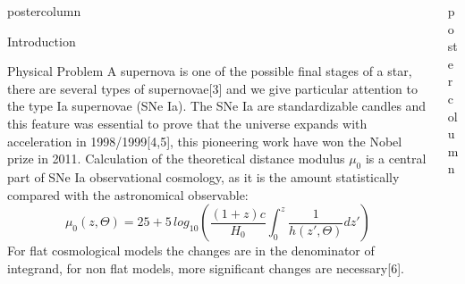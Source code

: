 \documentclass[final,hyperref={pdfpagelabels=false}]{beamer}
\newlength{\columnheight}
\begin{document}
\begin{frame}
\begin{columns}
\begin{column}{.245\textwidth}
\begin{beamercolorbox}[center,wd=\textwidth]{postercolumn}
\begin{minipage}[T]{.95\textwidth}
{\begin{block}{Introduction}
            \end{block}
            \vspace{.005\columnheight}
  			\begin{block}{Physical Problem}
              A supernova is one of the possible final stages of a star, there are several types of supernovae[3] and we give particular attention to the type Ia supernovae (SNe Ia). The SNe Ia are standardizable candles and this feature was essential to prove that the universe expands with acceleration in 1998/1999[4,5], this pioneering work have won the Nobel prize in 2011.
              Calculation of the theoretical distance modulus $\mu_0$ is a central part of SNe Ia observational cosmology, as it is the amount statistically compared with the astronomical observable:
            {\small  \[
             \mu_0(z,\Theta)=25+5\,log_{10}\left( \frac{(1+z)c}{H_0}\int_{0}^{z}\frac{1}{h(z',\Theta)}dz' \right) 
             \]}
             For flat cosmological models the changes are in the denominator of integrand, for non flat models, more significant changes are necessary[6].
             \end{block}
          }
        \end{minipage}
      \end{beamercolorbox}
    \end{column}

    \begin{column}{.49\textwidth}
      \begin{beamercolorbox}[center,wd=\textwidth]{postercolumn}
        \begin{minipage}[T]{.95\textwidth} %
          \parbox[t][\columnheight]{\textwidth}{ %
            
}
\end{minipage}
\end{beamercolorbox}
\end{column}
\end{columns}
\end{frame}
\end{document}
